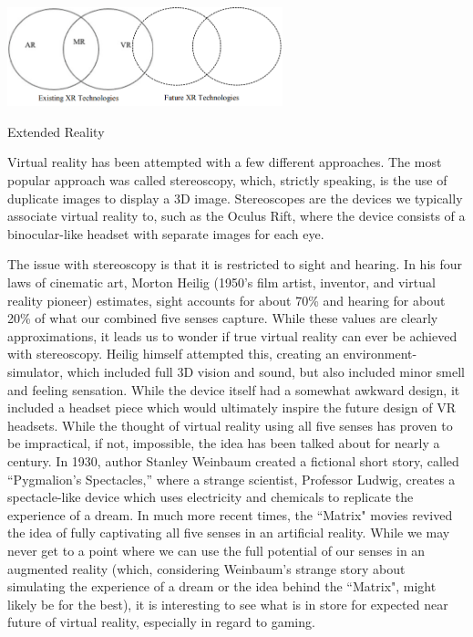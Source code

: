 \documentclass[12pt]{article}
\begin{document}
\begin{center}
\includegraphics[width = 8cm]{Image D.png}

Extended Reality
\cite{vermaAdvancesAugmentedReality2022a}
\end{center}


Virtual reality has been attempted with a few different approaches. The most popular approach was called stereoscopy, which, strictly speaking, is the use of duplicate images to display a 3D image. Stereoscopes are the devices we typically associate virtual reality to, such as the Oculus Rift, where the device consists of a binocular-like headset with separate images for each eye. 

The issue with stereoscopy is that it is restricted to sight and hearing. In his four laws of cinematic art, Morton Heilig (1950's film artist, inventor, and virtual reality pioneer) estimates, sight accounts for about 70\% and hearing for about 20\% of what our combined five senses capture. While these values are clearly approximations, it leads us to wonder if true virtual reality can ever be achieved with stereoscopy. Heilig himself attempted this, creating an environment-simulator, which included full 3D vision and sound, but also included minor smell and feeling sensation. While the device itself had a somewhat awkward design, it included a headset piece which would ultimately inspire the future design of VR headsets. While the thought of virtual reality using all five senses has proven to be impractical, if not, impossible, the idea has been talked about for nearly a century. In 1930, author Stanley Weinbaum created a fictional short story, called ``Pygmalion’s Spectacles,” where a strange scientist, Professor Ludwig, creates a spectacle-like device which uses electricity and chemicals to replicate the experience of a dream. In much more recent times, the ``Matrix" movies revived the idea of fully captivating all five senses in an artificial reality. While we may never get to a point where we can use the full potential of our senses in an augmented reality (which, considering Weinbaum's strange story about simulating the experience of a dream or the idea behind the ``Matrix", might likely be for the best), it is interesting to see what is in store for expected near future of virtual reality, especially in regard to gaming.
\cite{grasnickBasicsVirtualReality2021a}
\end{document}
